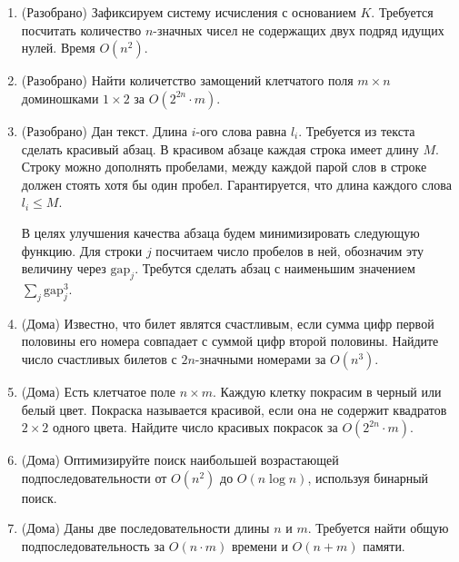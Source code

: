 \section{}

\begin{enumerate}

  \item (Разобрано) Зафиксируем систему исчисления с основанием $K$. Требуется 
  посчитать количество $n$-значных чисел не содержащих двух подряд
  идущих нулей. Время $O(n^2)$.
  
  \item (Разобрано) Найти количетство замощений клетчатого поля $m \times n$ 
  доминошками $1 \times 2$ за $O(2^{2n} \cdot m)$.

  \item (Разобрано) Дан текст. Длина $i$-ого слова равна $l_i$. Требуется
  из текста сделать красивый абзац. В красивом абзаце каждая строка имеет
  длину $M$. Строку можно дополнять пробелами, между каждой парой слов в
  строке должен стоять хотя бы один пробел. 
  Гарантируется, что длина каждого слова $l_i \leq M$.\par
   В целях улучшения качества абзаца будем минимизировать следующую функцию. Для строки
  $j$ посчитаем число пробелов в ней, обозначим эту величину через $\text{gap}_j$.
  Требутся сделать абзац с наименьшим значением $\sum_j \text{gap}_j^3$.

  \item (Дома) Известно, что билет являтся счастливым, если сумма цифр первой
  половины его номера совпадает с суммой цифр второй половины. Найдите число
  счастливых билетов с $2n$-значными номерами за $O(n^3)$.

  \item (Дома) Есть клетчатое поле $n \times m$. Каждую клетку покрасим в
  черный или белый цвет. Покраска называется красивой, если она не содержит
  квадратов $2 \times 2$ одного цвета. Найдите число красивых покрасок за 
  $O(2^{2n}\cdot m)$.

  \item (Дома) Оптимизируйте поиск наибольшей возрастающей подпоследовательности
  от $O(n^2)$ до $O(n \log n)$, используя бинарный поиск.

  \item (Дома) Даны две последовательности длины $n$ и $m$. 
  Требуется найти общую подпоследовательность за $O(n \cdot m)$ времени и $O(n + m)$
  памяти. 
  

\end{enumerate}


